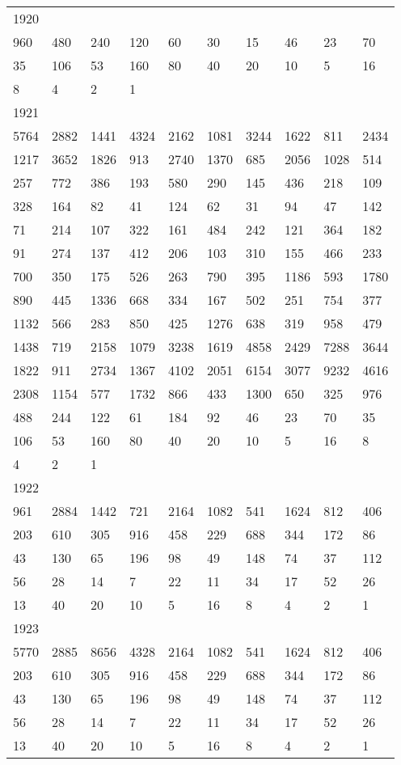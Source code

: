 \begin{longtable}{*{10}{l}}
1920&&&&&&&&&\\
960& 480& 240& 120& 60& 30& 15& 46& 23& 70\\
35& 106& 53& 160& 80& 40& 20& 10& 5& 16\\
8& 4& 2& 1& \\

1921&&&&&&&&&\\
5764& 2882& 1441& 4324& 2162& 1081& 3244& 1622& 811& 2434\\
1217& 3652& 1826& 913& 2740& 1370& 685& 2056& 1028& 514\\
257& 772& 386& 193& 580& 290& 145& 436& 218& 109\\
328& 164& 82& 41& 124& 62& 31& 94& 47& 142\\
71& 214& 107& 322& 161& 484& 242& 121& 364& 182\\
91& 274& 137& 412& 206& 103& 310& 155& 466& 233\\
700& 350& 175& 526& 263& 790& 395& 1186& 593& 1780\\
890& 445& 1336& 668& 334& 167& 502& 251& 754& 377\\
1132& 566& 283& 850& 425& 1276& 638& 319& 958& 479\\
1438& 719& 2158& 1079& 3238& 1619& 4858& 2429& 7288& 3644\\
1822& 911& 2734& 1367& 4102& 2051& 6154& 3077& 9232& 4616\\
2308& 1154& 577& 1732& 866& 433& 1300& 650& 325& 976\\
488& 244& 122& 61& 184& 92& 46& 23& 70& 35\\
106& 53& 160& 80& 40& 20& 10& 5& 16& 8\\
4& 2& 1& \\

1922&&&&&&&&&\\
961& 2884& 1442& 721& 2164& 1082& 541& 1624& 812& 406\\
203& 610& 305& 916& 458& 229& 688& 344& 172& 86\\
43& 130& 65& 196& 98& 49& 148& 74& 37& 112\\
56& 28& 14& 7& 22& 11& 34& 17& 52& 26\\
13& 40& 20& 10& 5& 16& 8& 4& 2& 1\\

1923&&&&&&&&&\\
5770& 2885& 8656& 4328& 2164& 1082& 541& 1624& 812& 406\\
203& 610& 305& 916& 458& 229& 688& 344& 172& 86\\
43& 130& 65& 196& 98& 49& 148& 74& 37& 112\\
56& 28& 14& 7& 22& 11& 34& 17& 52& 26\\
13& 40& 20& 10& 5& 16& 8& 4& 2& 1\\


\end{longtable}
